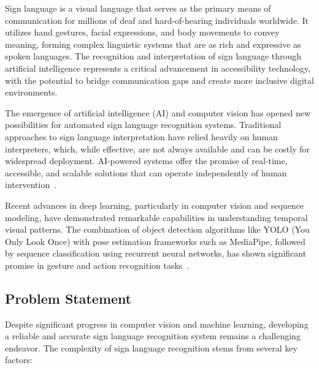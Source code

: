 \documentclass[11pt, a4paper]{article}
\begin{document}
Sign language is a visual language that serves as the primary means of communication for millions of deaf and hard-of-hearing individuals worldwide. It utilizes hand gestures, facial expressions, and body movements to convey meaning, forming complex linguistic systems that are as rich and expressive as spoken languages. The recognition and interpretation of sign language through artificial intelligence represents a critical advancement in accessibility technology, with the potential to bridge communication gaps and create more inclusive digital environments.

The emergence of artificial intelligence (AI) and computer vision has opened new possibilities for automated sign language recognition systems. Traditional approaches to sign language interpretation have relied heavily on human interpreters, which, while effective, are not always available and can be costly for widespread deployment. AI-powered systems offer the promise of real-time, accessible, and scalable solutions that can operate independently of human intervention~\cite{Adaloglou21}.

Recent advances in deep learning, particularly in computer vision and sequence modeling, have demonstrated remarkable capabilities in understanding temporal visual patterns. The combination of object detection algorithms like YOLO (You Only Look Once) with pose estimation frameworks such as MediaPipe, followed by sequence classification using recurrent neural networks, has shown significant promise in gesture and action recognition tasks~\cite{Camgoz20}.

\subsection{Problem Statement}

Despite significant progress in computer vision and machine learning, developing a reliable and accurate sign language recognition system remains a challenging endeavor. The complexity of sign language recognition stems from several key factors:
\end{document}
